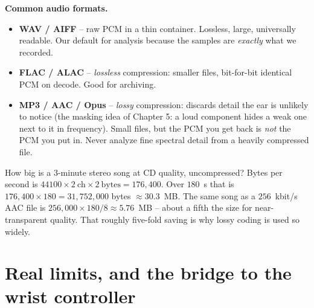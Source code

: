 \begin{focusbox}
\textbf{Common audio formats.}
\begin{itemize}
\item \textbf{WAV / AIFF} -- raw PCM in a thin container. Lossless, large, universally readable.
  Our default for analysis because the samples are \emph{exactly} what we recorded.
\item \textbf{FLAC / ALAC} -- \emph{lossless} compression: smaller files, bit-for-bit identical
  PCM on decode. Good for archiving.
\item \textbf{MP3 / AAC / Opus} -- \emph{lossy} compression: discards detail the ear is unlikely
  to notice (the masking idea of Chapter 5: a loud component hides a weak one next to it in frequency). Small files, but the
  PCM you get back is \emph{not} the PCM you put in. Never analyze fine spectral detail from a
  heavily compressed file.
\end{itemize}
\end{focusbox}

\begin{example}
\label{ch26:ex-size}
How big is a $3$-minute stereo song at CD quality, uncompressed? Bytes per second is
$44100 \times 2~\text{ch} \times 2~\text{bytes} = 176{,}400$. Over $180$~s that is
$176{,}400 \times 180 = 31{,}752{,}000$ bytes $\approx 30.3$~MB. The same song as a $256$~kbit/s
AAC file is $256{,}000 \times 180 / 8 \approx 5.76$~MB -- about a fifth the size for
near-transparent quality. That roughly five-fold saving is why lossy coding is used so widely.
\end{example}

\section{Real limits, and the bridge to the wrist controller}
\label{ch26:claims}

